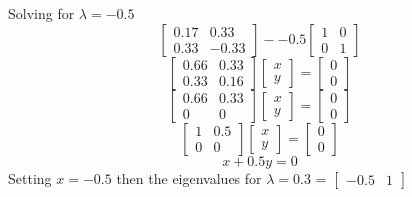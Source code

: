 \documentclass[12pt,a4paper]{paper}
\begin{document}
\begin{enumerate}
\begin{enumerate}
Solving for $\lambda = -0.5$
\begin{equation}
\left[\begin{array}{cc}0.17 & 0.33 \\ 0.33 & -0.33\end{array}\right] - -0.5 \left[\begin{array}{cc}1 & 0 \\0 & 1\end{array}\right]
\end{equation}
\begin{equation}
\left[\begin{array}{cc}0.66 & 0.33 \\ 0.33 & 0.16\end{array}\right]\left[\begin{array}{c}x\\y\end{array}\right] = \left[\begin{array}{c}0\\0\end{array}\right]
\end{equation}
\begin{equation}
\left[\begin{array}{cc}0.66 & 0.33 \\ 0 & 0\end{array}\right]\left[\begin{array}{c}x\\y\end{array}\right] = \left[\begin{array}{c}0\\0\end{array}\right]
\end{equation}
\begin{equation}
\left[\begin{array}{cc} 1 & 0.5 \\ 0 & 0\end{array}\right]\left[\begin{array}{c}x\\y\end{array}\right] = \left[\begin{array}{c}0\\0\end{array}\right]
\end{equation}
\begin{equation}
x + 0.5 y = 0
\end{equation}
Setting $x = -0.5$ then the eigenvalues for $\lambda = 0.3$ = $\left[\begin{array}{cc}-0.5 &  1\end{array}\right]$

\end{enumerate}
\end{enumerate}
\end{document}
